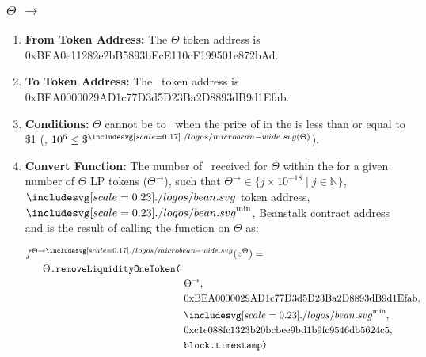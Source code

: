 \documentclass[class=article, crop=false]{standalone}
\begin{document}
\subsubsection{$\Theta$ $\rightarrow$ \Bean}
    \begin{enumerate}
        \item \textbf{From Token Address:} The $\Theta$ token address is 0xBEA0e11282e2bB5893bEcE110cF199501e872bAd.
        \item \textbf{To Token Address:} The \Bean\ token address is 0xBEA0000029AD1c77D3d5D23Ba2D8893dB9d1Efab.
        \item \textbf{Conditions:}  $\Theta$ cannot be  to  \Bean\ when the price of  in the  is less than or equal to \$1 (, $10^6 \leq \$^{\bean(\Theta)}$). 
        \item \textbf{Convert Function:} The number of \Bean\ received for   $\Theta$ within the  for a given number of $\Theta$ LP tokens  ($\Theta^{\rightarrow}$), such that $\Theta^{\rightarrow} \in \{j \times 10^{-18} \mid j \in \mathbb{N} \}$, $\Bean$ token address, $\Bean^{\text{min}}$, Beanstalk contract address and  is the result of calling the   function on $\Theta$ as:

        \begin{multline*}
            \begin{aligned}
            & f^{\Theta \rightarrow \bean}(z^{\Theta}) = \\
            & \hspace{0.6cm}\Theta \code{.removeLiquidityOneToken(} \\
            & \hspace{5.6cm} \Theta^{\rightarrow},\ \\
            & \hspace{5.6cm} \text{0xBEA0000029AD1c77D3d5D23Ba2D8893dB9d1Efab},\ \\
            & \hspace{5.6cm} \Bean^{\text{min}},\ \\
            & \hspace{5.6cm} \text{0xc1e088fc1323b20bcbee9bd1b9fc9546db5624c5},\ \\
            & \hspace{5.6cm} \code{block.timestamp} \code{)}
            \end{aligned}
        \end{multline*}
        
    \end{enumerate}
\end{document}

